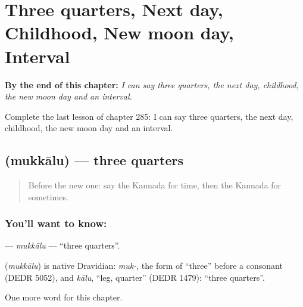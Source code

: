 
\chapter{Three quarters, Next day, Childhood, New moon day, Interval}
\label{ch:ka-three-quarters-next-day-childhood-new-moon-day-interval}

\begin{chapteropening}
\textbf{By the end of this chapter:} \emph{I can say three quarters, the next day, childhood, the new moon day and an interval.}

Complete the last lesson of chapter 285: I can say three quarters, the next day, childhood, the new moon day and an interval.
\end{chapteropening}

\section[\texorpdfstring{\kn{ಮುಕ್ಕಾಲು} (mukkālu)}{ಮುಕ್ಕಾಲು (mukkālu)}]{ (mukkālu) — three quarters}

\label{lesson:KA-C285-mukkalu}



\begin{quote}
Before the new one: say the Kannada for time, then the Kannada for sometimes.
\end{quote}

\subsection*{You'll want to know: }
\textbf{} — \emph{mukkālu} — \textquotedblleft{}three quarters\textquotedblright{}.

\begin{cousinweb}
\textbf{} (\emph{mukkālu}) is native Dravidian: \emph{muk-}, the form of \textquotedblleft{}three\textquotedblright{} before a consonant (DEDR 5052), and \emph{kālu}, \textquotedblleft{}leg, quarter\textquotedblright{} (DEDR 1479): \textquotedblleft{}three quarters\textquotedblright{}.
\end{cousinweb}

\begin{grammarlens}[title={What you've built}]
One more word for this chapter.
\end{grammarlens}

